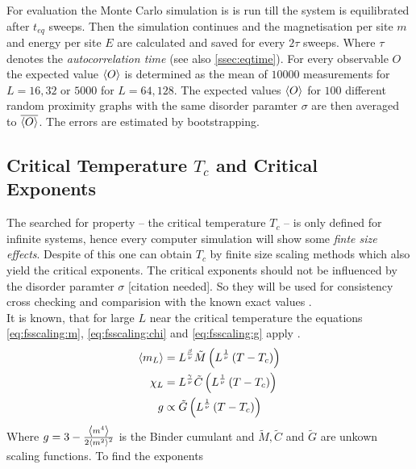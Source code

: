     For evaluation the Monte Carlo simulation is is run till the system
    is equilibrated after \(t_{eq}\) sweeps. Then the simulation continues
    and the magnetisation per site \(m\) and energy per site \(E\)
    are calculated and saved for every \(2\tau\) sweeps. Where \(\tau\)
    denotes the \emph{autocorrelation time} (see also \ref{ssec:eqtime}).
    For every observable \(O\) the expected value \(\left< O \right>\) is determined
    as the mean of \(10000\) measurements for \(L=16,32\) or \(5000\) for
    \(L=64,128\). The expected values \(\left< O \right>\) for \(100\) different
    random proximity graphs with the same disorder paramter \(\sigma\)
    are then averaged to \(\overline{\left< O \right>}\). The errors are estimated
    by bootstrapping.

\subsection{Critical Temperature $T_c$ and Critical Exponents}
\label{ssec:finitesize}
    The searched for property -- the critical temperature \(T_c\)
    -- is only defined for infinite systems, hence every computer
    simulation will show some \emph{finte size effects}.
    Despite of this one can obtain \(T_c\) by finite size scaling
    methods \cite[S. ??]{NewmanBarkema1999} which also yield the critical
    exponents. The critical exponents should not be influenced by the
    disorder paramter \(\sigma\) [citation needed]. So they will be
    used for consistency cross checking and comparision with the known
    exact values \cite[S. 59]{Pelissetto2002}.\\
    It is known, that for large \(L\) near the critical temperature the
    equations \eqref{eq:fsscaling:m}, \eqref{eq:fsscaling:chi} and
    \eqref{eq:fsscaling:g} apply \cite[p. 145f]{Katzgraber2011}.
    \begin{align}
        \label{eq:fsscaling:m}
        \left< m_L \right> &= L^\frac{\beta}{\nu} \tilde{M}\left(L^\frac{1}{\nu}\left(T-T_c\right)\right)\\
        \label{eq:fsscaling:chi}
        \chi_L    &= L^\frac{\gamma}{\nu} \tilde{C}\left(L^\frac{1}{\nu}\left(T-T_c\right)\right)\\
        \label{eq:fsscaling:g}
        g         &\propto \tilde{G}\left(L^\frac{1}{\nu}\left(T-T_c\right)\right)
    \end{align}
    Where \(g = 3-\frac{\left< m^4 \right>}{2\left< m^2 \right>^2}\) \cite{Binder1981} is
    the Binder cumulant and \(\tilde{M}, \tilde{C}\) and \(\tilde{G}\)
    are unkown scaling functions. To find the exponents
